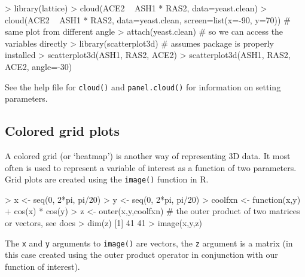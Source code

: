 \begin{R}
> library(lattice)
> cloud(ACE2 ~ ASH1 * RAS2, data=yeast.clean)
> cloud(ACE2 ~ ASH1 * RAS2, data=yeast.clean, screen=list(x=-90, y=70)) # same plot from different angle
> attach(yeast.clean) # so we can access the variables directly
> library(scatterplot3d) # assumes package is properly installed
> scatterplot3d(ASH1, RAS2, ACE2)
> scatterplot3d(ASH1, RAS2, ACE2, angle=-30)
\end{R}
See the help file for \lstinline!cloud()! and \lstinline!panel.cloud()!
for information on setting parameters.

\subsection{Colored grid plots}

A colored grid (or `heatmap') is another way of representing 3D data. It
most often is used to represent a variable of interest as a function of
two parameters. Grid plots are created using the \lstinline!image()!
function in R.

\begin{R}
> x <- seq(0, 2*pi, pi/20)
> y <- seq(0, 2*pi, pi/20)
> coolfxn <- function(x,y){
+    cos(x) * cos(y)}
> z <- outer(x,y,coolfxn) # the outer product of two matrices or vectors, see docs
> dim(z)
[1] 41 41
> image(x,y,z)
\end{R}
The \lstinline!x! and \lstinline!y! arguments to \lstinline!image()! are
vectors, the \lstinline!z! argument is a matrix (in this case created
using the outer product operator in conjunction with our function of
interest).
